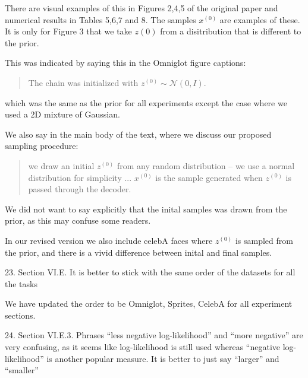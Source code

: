 \documentclass{article}
\begin{document}
{\color{red}
There are visual examples of this in Figures 2,4,5 of the original paper and numerical results in Tables 5,6,7 and 8. The samples $x^{(0)}$ are examples of these. It is only for Figure 3 that we take $z{(0)}$ from a disitribution that is different to the prior.

This was indicated by saying this in the Omniglot figure captions:

\begin{quote}
The chain was initialized with $z^{(0)} \sim \mathcal{N}(0,I)$.
\end{quote}
which was the same as the prior for all experiments except the case where we used a 2D mixture of Gaussian.

We also say in the main body of the text, where we discuss our proposed sampling procedure:
\begin{quote}
we draw an initial $z^{(0)}$ from any random distribution – we use a normal distribution for simplicity ... $x^{(0)}$ is the sample generated when $z^{(0)}$ is passed through the decoder.
\end{quote}

We did not want to say explicitly that the inital samples was drawn from the prior, as this may confuse some readers.

In our revised version we also include celebA faces where $z^{(0)}$ is sampled from the prior, and there is a vivid difference between inital and final samples.\\


}


{\color{blue}
23. Section VI.E. It is better to stick with the same order of the datasets for all the tasks\\
}

{\color{red} We have updated the order to be Omniglot, Sprites, CelebA for all experiment sections.\\}

{\color{blue}
24. Section VI.E.3. Phrases ``less negative log-likelihood'' and ``more negative'' are very confusing, as it seems like log-likelihood is still used whereas ``negative log-likelihood'' is another popular measure. It is better to just say ``larger'' and ``smaller''\\
}
\end{document}
